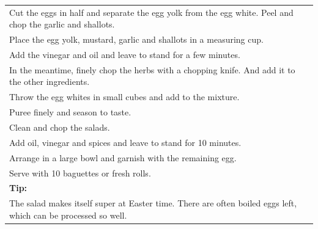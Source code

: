\begin{tabular}{p{15cm}}
	\\
  Cut the eggs in half and separate the egg yolk from the egg white. Peel and chop the garlic and shallots.\\
  Place the egg yolk, mustard, garlic and shallots in a measuring cup.\\
  Add the vinegar and oil and leave to stand for a few minutes.\\
  In the meantime, finely chop the herbs with a chopping knife. And add it to the other ingredients.\\
  Throw the egg whites in small cubes and add to the mixture.\\
  Puree finely and season to taste.\\
  Clean and chop the salads.\\
  Add oil, vinegar and spices and leave to stand for 10 minutes.\\
  Arrange in a large bowl and garnish with the remaining egg.\\
  Serve with 10 baguettes or fresh rolls.\\
  \textbf{Tip:}\\
  The salad makes itself super at Easter time. There are often boiled eggs left, which can be processed so well.
\end{tabular}

